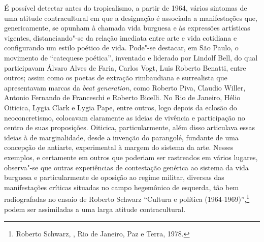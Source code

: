 \asterisc

É possível detectar antes do tropicalismo, a partir de 1964, vários
sintomas de uma atitude contracultural em que a designação é
associada a manifestações que, genericamente, se opunham à chamada vida
burguesa e às expressões artísticas vigentes, distanciando"-se da relação
imediata entre arte e vida cotidiana e configurando um estilo poético de
vida. Pode"-se destacar, em São Paulo, o movimento de ``catequese
poética'', inventado e liderado por Lindolf Bell, do qual participavam
Álvaro Alves de Faria, Carlos Vogt, Luis Roberto Benatti, entre outros; assim
como os poetas de extração rimbaudiana e surrealista que apresentavam
marcas da \emph{beat generation}, como Roberto Piva, Claudio Willer,
Antonio Fernando de Franceschi e Roberto Bicelli. No Rio de Janeiro,
Hélio Oiticica, Lygia Clark e Lygia Pape, entre outros, logo depois da
eclosão do neoconcretismo, colocavam claramente as ideias de vivência e
participação no centro de suas proposições. Oiticica, particularmente,
além disso articulava essas ideias à de marginalidade, desde a invenção
do parangolé, fundante de uma concepção de antiarte, experimental à
margem do sistema da arte. Nesses exemplos, e certamente em outros que
poderiam ser rastreados em vários lugares, observa"-se que outras
experiências de contestação genérica ao sistema da vida burguesa e
particularmente de oposição ao regime militar, diversas das
manifestações críticas situadas no campo hegemônico de esquerda, tão bem
radiografadas no ensaio de Roberto Schwarz ``Cultura e política
(1964-1969)'',\footnote{Roberto Schwarz, {}, Rio de Janeiro, Paz e Terra, 1978.} podem ser assimiladas a
uma larga atitude contracultural.

